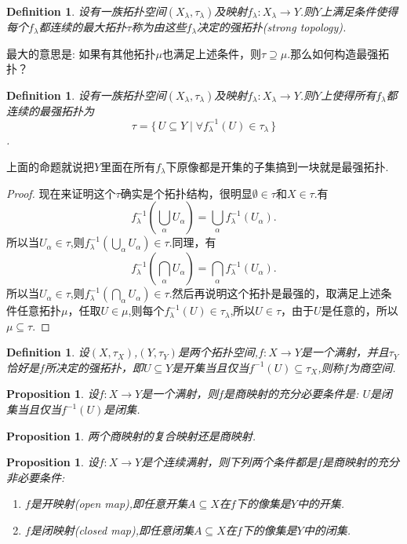 \documentclass{article}
\newtheorem{proposition}[theorem]{Proposition}
\newtheorem{definition}[theorem]{Definition}
\newcommand*{\xfunc}[4]{{#2}\colon{#3}{#1}{#4}}
\newcommand*{\func}[3]{\xfunc{\to}{#1}{#2}{#3}}
\newcommand\Set[2]{\{\,#1\mid#2\,\}} %
\begin{document}
\begin{definition}
设有一族拓扑空间$(X_\lambda,\tau_\lambda)$及映射$\func{f_\lambda}{X_\lambda}{Y}$.则$Y$上满足条件使得每个$f_\lambda$都连续的最大拓扑$\tau$称为由这些$f_\lambda$决定的强拓扑(strong topology).
\end{definition}

最大的意思是: 如果有其他拓扑$\mu$也满足上述条件，则$\tau \supseteq \mu$.那么如何构造最强拓扑？

\begin{definition}
设有一族拓扑空间$(X_\lambda,\tau_\lambda)$及映射$\func{f_\lambda}{X_\lambda}{Y}$.则$Y$上使得所有$f_\lambda$都连续的最强拓扑为\[\tau = \Set{U \subseteq Y}{\forall f_\lambda^{-1}(U) \in \tau_\lambda}\].
\end{definition}

上面的命题就说把$Y$里面在所有$f_\lambda$下原像都是开集的子集搞到一块就是最强拓扑.

\begin{proof}
现在来证明这个$\tau$确实是个拓扑结构，很明显$\emptyset \in \tau$和$X \in \tau$.有\[f^{-1}_\lambda(\bigcup\limits_{\alpha} U_\alpha)=\bigcup\limits_\alpha f_\lambda^{-1}(U_\alpha).\]所以当$U_\alpha \in \tau$,则$f^{-1}_\lambda(\bigcup\limits_{\alpha} U_\alpha) \in \tau$.同理，有\[f^{-1}_\lambda(\bigcap\limits_{\alpha} U_\alpha)=\bigcap\limits_\alpha f_\lambda^{-1}(U_\alpha).\]所以当$U_\alpha \in \tau$,则$f^{-1}_\lambda(\bigcap\limits_{\alpha} U_\alpha) \in \tau$.然后再说明这个拓扑是最强的，取满足上述条件任意拓扑$\mu$，任取$U \in \mu$,则每个$f_\lambda^{-1}(U) \in \tau_\lambda$,所以$U \in \tau$，由于$U$是任意的，所以$\mu \subseteq \tau$.
\end{proof}

\begin{definition}
设$(X,\tau_X)$,$(Y,\tau_Y)$是两个拓扑空间,$\func{f}{X}{Y}$是一个满射，并且$\tau_Y$恰好是$f$所决定的强拓扑，即$U \subseteq Y$是开集当且仅当$f^{-1}(U) \subseteq \tau_X$,则称$f$为商空间.
\end{definition}

\begin{proposition}
设$\func{f}{X}{Y}$是一个满射，则$f$是商映射的充分必要条件是: $U$是闭集当且仅当$f^{-1}(U)$是闭集.
\end{proposition}

\begin{proposition}
两个商映射的复合映射还是商映射.
\end{proposition}

\begin{proposition}
设$\func{f}{X}{Y}$是个连续满射，则下列两个条件都是$f$是商映射的充分非必要条件:
\begin{enumerate}
	\item $f$是开映射(open map),即任意开集$A \subseteq X$在$f$下的像集是$Y$中的开集.
	\item $f$是闭映射(closed map),即任意闭集$A \subseteq X$在$f$下的像集是$Y$中的闭集.
\end{enumerate}
\end{proposition}
\end{document}
